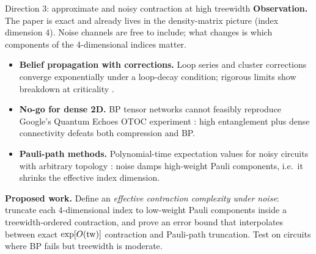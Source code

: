 \begin{frame}{Direction 3: approximate and noisy contraction at high treewidth}
    \textbf{Observation.} The paper is exact and already lives in the density-matrix picture (index dimension $4$). Noise channels are free to include; what changes is which components of the 4-dimensional indices matter.
    \begin{itemize}
        \item \textbf{Belief propagation with corrections.} Loop series \parencite{loopseries2024} and cluster corrections \parencite{clustercorr2025} converge exponentially under a loop-decay condition; rigorous limits show breakdown at criticality \parencite{bprigorous2026}.
        \item \textbf{No-go for dense 2D.} BP tensor networks cannot feasibly reproduce Google's Quantum Echoes OTOC experiment \parencite{echoesnogo2026}: high entanglement plus dense connectivity defeats both compression and BP.
        \item \textbf{Pauli-path methods.} Polynomial-time expectation values for noisy circuits with arbitrary topology \parencite{schuster2025prx,paulilocalnoise2025,paulibeyondavg2025}: noise damps high-weight Pauli components, i.e.\ it shrinks the effective index dimension.
    \end{itemize}
    \textbf{Proposed work.} Define an \emph{effective contraction complexity under noise}: truncate each 4-dimensional index to low-weight Pauli components inside a treewidth-ordered contraction, and prove an error bound that interpolates between exact $\exp[O(\operatorname{tw})]$ contraction and Pauli-path truncation. Test on circuits where BP fails but treewidth is moderate.
\end{frame}
